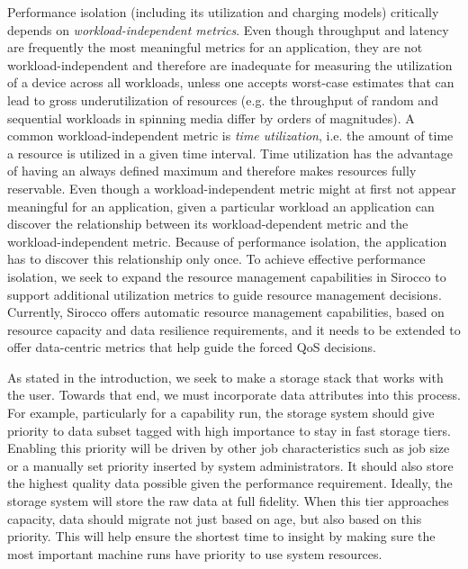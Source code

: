 Performance isolation (including its utilization and charging models)
critically depends on \emph{workload-independent metrics}. Even
though throughput and latency are frequently the most meaningful
metrics for an application, they are not workload-independent and
therefore are inadequate for measuring the utilization of a device
across all workloads, unless one accepts worst-case estimates that
can lead to gross underutilization of resources (e.g. the throughput
of random and sequential workloads in spinning media differ by
orders of magnitudes). A common workload-independent metric is
\emph{time utilization}, i.e. the amount of time a resource is
utilized in a given time interval. Time utilization has the advantage
of having an always defined maximum and therefore makes resources
fully reservable. Even though a workload-independent metric might
at first not appear meaningful for an application, given a particular
workload an application can discover the relationship between its
workload-dependent metric and the workload-independent metric.
Because of performance isolation, the application has to discover
this relationship only once.
To achieve effective performance isolation, we seek to expand the resource management
capabilities in Sirocco to support additional utilization 
metrics to guide resource management
decisions. Currently, Sirocco offers automatic resource management capabilities,
based on resource capacity and data resilience requirements, and it needs to be extended
to offer data-centric metrics that help guide the forced QoS decisions.

As stated in the introduction, we seek to make a storage stack that works with
the user. Towards that end, we must incorporate data attributes into this
process. For example, particularly for a capability run, the storage system
should give priority to data subset tagged with high importance to stay in fast
storage tiers. Enabling this priority will be driven by other job
characteristics such as job size or a manually set priority inserted by system
administrators. It should also store the highest quality data possible given
the performance requirement. Ideally, the storage system will store the raw
data at full fidelity. When this tier approaches capacity, data should migrate
not just based on age, but also based on this priority. This will help ensure
the shortest time to insight by making sure the most important machine runs
have priority to use system resources.

